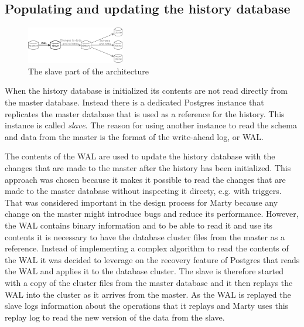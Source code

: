 \subsection{Populating and updating the history database}

\begin{figure}
  \vspace{-20pt}
  \begin{center}
    \includegraphics[width=0.38\textwidth]{img/architecture-slave}
  \end{center}
  \vspace{-20pt}
  \caption{The slave part of the architecture}
  \vspace{-10pt}
\end{figure}

When the history database is initialized its contents are not read directly from the master database.
Instead there is a dedicated Postgres instance that replicates the master database that is used as a reference for the history.
This instance is called \textit{slave}.
The reason for using another instance to read the schema and data from the master is the format of the write-ahead log, or WAL.

The contents of the WAL are used to update the history database with the changes that are made to the master after the history has been initialized.
This approach was chosen because it makes it possible to read the changes that are made to the master database without inspecting it directy, e.g. with triggers.
That was considered important in the design process for Marty because any change on the master might introduce bugs and reduce its performance.
However, the WAL contains binary information and to be able to read it and use its contents it is necessary to have the database cluster files from the master as a reference.
Instead of implementing a complex algorithm to read the contents of the WAL it was decided to leverage on the recovery feature of Postgres that reads the WAL and applies it to the database cluster.
The slave is therefore started with a copy of the cluster files from the master database and it then replays the WAL into the cluster as it arrives from the master.
As the WAL is replayed the slave logs information about the operations that it replays and Marty uses this replay log to read the new version of the data from the slave.

